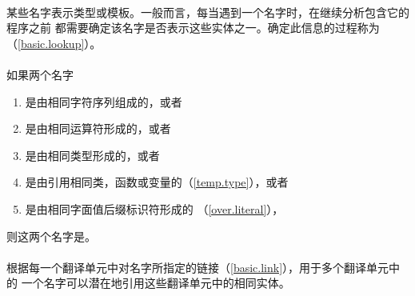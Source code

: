 \paragraph{} %
某些名字表示类型或模板。一般而言，每当遇到一个名字时，在继续分析包含它的程序之前
都需要确定该名字是否表示这些实体之一。确定此信息的过程称为
（\ref{basic.lookup}）。

\paragraph{} %
如果两个名字
\begin{enumerate}
  \item 是由相同字符序列组成的，或者
  \item 是由相同运算符形成的，或者
  \item 是由相同类型形成的，或者
  \item 是由引用相同类，函数或变量的（\ref{temp.type}），或者
  \item 是由相同字面值后缀标识符形成的
        （\ref{over.literal}），
\end{enumerate}
则这两个名字是。

\paragraph{} %
根据每一个翻译单元中对名字所指定的链接（\ref{basic.link}），用于多个翻译单元中的
一个名字可以潜在地引用这些翻译单元中的相同实体。
